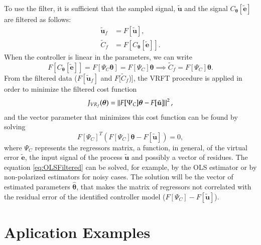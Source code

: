To use the filter, it is sufficient that the sampled signal, $\tilde{\bm{u}}$ and the signal $C_{\bm{\theta}}[\tilde{\bm{e}}]$ are filtered as follows:
\begin{align}
   \tilde{\bm{u}}_f &= F[\tilde{\bm{u}}], \\
   \tilde{C}_f &= F[C_{\bm{\theta}}[\tilde{\bm{e}}]].
\label{eq:}
\end{align}
When the controller is linear in the parameters, we can write
\begin{equation}
   F[C_{\bm{\theta}}[\tilde{\bm{e}}]] = F[\Psi_C \bm{\theta}] = F[\Psi_C]\bm{\theta} \implies \tilde{C}_f = F[\Psi_C] \bm{\theta}.
\end{equation}
From the filtered data ($F[\tilde{\bm{u}}_f]$ and $F[\tilde{C}_f$)], the VRFT procedure is applied in order to minimize the filtered cost function
\begin{equation}
   J_{VR_f}(\bm{\theta}) = \left\lVert F[\Psi_C] \bm{\theta} - F[\tilde{\bm{u}}]\right\rVert^2,
\label{eq:JVRfiltrado}
\end{equation}
and the vector parameter that minimizes this cost function can be found by solving
\begin{equation}
   F[\Psi_C]^{T}\left(F[\Psi_C] \bm{\theta}-F[\tilde{\bm{u}}]\right)=0 ,
   \label{eq:OLSFiltered}
\end{equation}
where $\Psi_C$ represents the regressors matrix, a function, in general, of the virtual error $\tilde{\bm{e}}$, the input signal of the process $\tilde{\bm{u}}$ and possibly a vector of residues.
The equation \ref{eq:OLSFiltered} can be solved, for example, by the OLS estimator or by non-polarized estimators for noisy cases. The solution will be the vector  of estimated parameters $\hat{\bm{\theta}}$, that makes the matrix of regressors not correlated with the residual error of the identified controller model ($F[\Psi_C]-F[\tilde{\bm{u}}]$).


\section{Aplication Examples}%
\label{sec:aplication_examples}

